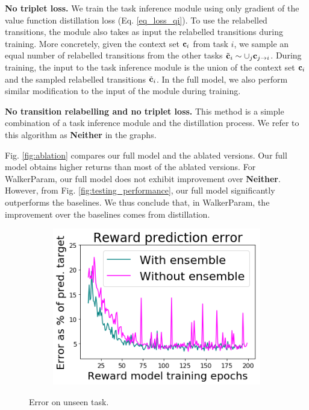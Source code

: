 \textbf{No triplet loss.} We train the task inference module using only gradient of the value function distillation loss (Eq. \ref{eq_loss_qi}).
To use the relabelled transitions, the module also takes as input the relabelled transitions during training.
More concretely, given the context set ${\bf c}_i$ from task $i$, we sample an equal number of relabelled transitions from the other tasks $\tilde{{\bf c}}_i \sim \cup_j {{\bf c}_{j \rightarrow{i} } }$. During training, the input to the task inference module is the union of the context set ${\bf c}_i$ and the sampled relabelled transitions $\tilde{{\bf c}}_i$. In the full model, we also perform similar modification to the input of the module during training.

\textbf{No transition relabelling and no triplet loss.} This method is a simple combination of a task inference module and the distillation process. We refer to this algorithm as \textbf{Neither} in the graphs.

Fig. \ref{fig:ablation} compares our full model and the ablated versions. Our full model obtains higher returns than most of the ablated versions. For WalkerParam, our full model does not exhibit improvement over  \textbf{Neither}. However, from Fig. \ref{fig:testing_performance}, our full model significantly outperforms the baselines. We thus conclude that, in WalkerParam, the improvement over the baselines comes from distillation.

\begin{figure}
    \flushright
    \vspace{-0.5em}
    \begin{subfigure}{0.16\paperwidth}
        \includegraphics[width=\linewidth]{chapter_2/fig/reward_pred_error.png}
    \end{subfigure}
    \caption{Error on unseen task.}\label{fig:reward_error}
    \vspace{-0.2em}
\end{figure}

